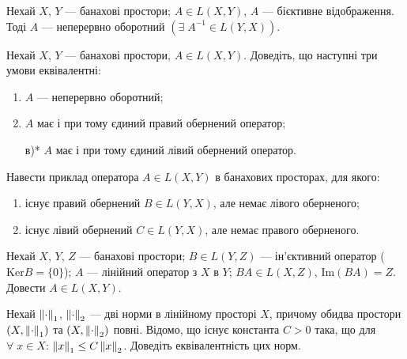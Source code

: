 
\begin{theory}
    \begin{theorem*}
        Нехай $X$, $Y$ --- банахові простори; $A \in L(X,Y)$,
        $A$ --- бієктивне відображення. Тоді $A$ --- неперервно оборотний
        $\left(\exists \; A^{-1} \in L(Y, X)\right)$.
    \end{theorem*}
\end{theory}

\begin{exercise}
    Нехай $X$, $Y$ --- банахові простори, $A \in L(X,Y)$.
    Доведіть, що наступні три умови еквівалентні:
    \begin{enumerate}
        \item $A$ --- неперервно оборотний;
        \item $A$ має і при тому єдиний правий обернений оператор;
        \item[в)*] $A$ має і при тому єдиний лівий обернений оператор.
    \end{enumerate}
\end{exercise}

\begin{exercise}
    Навести приклад оператора $A \in L(X,Y)$ в банахових просторах, для якого:
    \begin{enumerate}
        \item існує правий обернений $B\in L(Y,X)$, але немає лівого оберненого;
        \item існує лівий обернений $C\in L(Y,X)$, але немає правого оберненого.
    \end{enumerate}
\end{exercise}

\begin{exercise}
    Нехай $X$, $Y$, $Z$ --- банахові простори; $B \in L(Y,Z)$ --- ін'єктивний
    оператор ($\mathrm{Ker}B = \{0\}$); $A$ --- лінійний оператор з $X$ в $Y$;
    $BA \in L(X,Z)$, $\mathrm{Im}(BA) = Z$. Довести $A \in L(X,Y)$.
\end{exercise}

\begin{exercise}
    Нехай $\left\lVert\cdot\right\rVert_1$, $\left\lVert\cdot\right\rVert_2$  --- дві норми в лінійному просторі
    $X$, причому обидва простори $(X, \left\lVert\cdot\right\rVert_1)$ та $(X, \left\lVert\cdot\right\rVert_2)$ 
    повні. Відомо, що існує константа $C > 0$ така, що для $\forall \; x \in X$:
    $\left\lVert x\right\rVert_1 \leq C \left\lVert x\right\rVert_2$. Доведіть еквівалентність цих норм.
\end{exercise}


